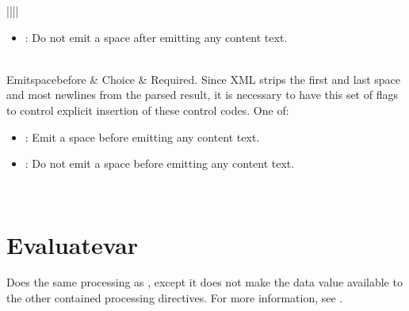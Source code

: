 \documentclass[letterpaper,12pt,english,openany,oneside]{sphinxmanual}
\begin{document}
\begin{savenotes}
\begin{tabular}[t]{||||}
\begin{itemize}
\item {} 
: Do not emit a space after emitting any content text.

\end{itemize}
\\
\hline
Emit\sphinxhyphen{}space\sphinxhyphen{}before
&
Choice
&
Required. Since XML strips the first and last space and most newlines from the parsed result, it is necessary to have this set of flags to control explicit insertion of these control codes. One of:
\begin{itemize}
\item {} 
: Emit a space before emitting any content text.

\item {} 
: Do not emit a space before emitting any content text.

\end{itemize}
\\
\hline
\end{tabular}
\par
\sphinxattableend\end{savenotes}


\section{Evaluate\sphinxhyphen{}var}
\label{\detokenize{SaveAsXML_DirectivesRef:evaluate-var}}
Does the same processing as , except it does not make the data value available to the other contained processing directives. For more information, see .

\label{\detokenize{SaveAsXML_DirectivesRef:dtd-content-rule-11}}
\end{document}
